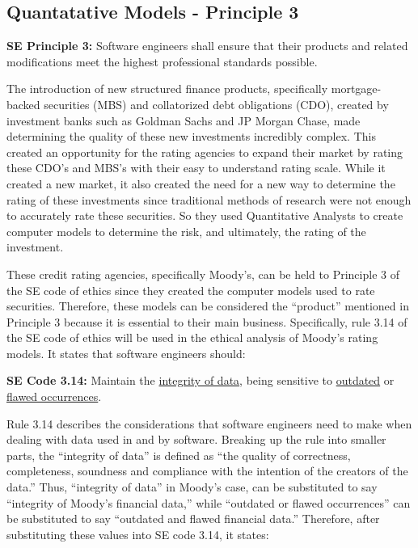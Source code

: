 \documentclass[11pt]{article}
\begin{document}
\begin{multicols}{2}
 
\subsection{Quantatative Models - Principle 3}

\begin{framed}
\noindent
\textbf{SE Principle 3:  }
\newline
Software engineers shall ensure that their products and related modifications meet the highest professional standards possible.
\end{framed}

The introduction of new structured finance products, specifically mortgage-backed securities (MBS) and collatorized debt obligations (CDO), created by investment banks such as Goldman Sachs and JP Morgan Chase, made determining the quality of these new investments incredibly complex. \cite[p.43]{govtReport} This created an opportunity for the rating agencies to expand their market by rating these CDO's and MBS's with their easy to understand rating scale. \cite[p.43]{govtReport}  While it created a new market, it also created the need for a new way to determine the rating of these investments since traditional methods of research were not enough to accurately rate these securities.\cite[p.43]{govtReport}  So they used Quantitative Analysts to create computer models to determine the risk, and ultimately, the rating of the investment. \cite{wiredFormula}\cite[p.120]{govtReport}  

These credit rating agencies, specifically Moody's, can be held to Principle 3 of the SE code of ethics since they created the computer models used to rate securities.  Therefore, these models can be considered the ``product''\cite{SEcode} mentioned in Principle 3 because it is essential to their main business.  Specifically, rule 3.14 of the SE code of ethics will be used in the ethical analysis of Moody's rating models.  It states that software engineers should:

\begin{framed}
\noindent
   \textbf{SE Code 3.14: } 
   \newline
   Maintain the \underline{integrity of data}, being sensitive to \underline{outdated} or \underline{flawed occurrences}.
\end{framed}

Rule 3.14 describes the considerations that software engineers need to make when dealing with data used in and by software.  Breaking up the rule into smaller parts, the ``integrity of data'' \cite{SEcode} is defined as ``the quality of correctness, completeness, soundness and compliance with the intention of the creators of the data.'' \cite{dataIntegrityDef} Thus, ``integrity of data'' in Moody's case, can be substituted to say ``integrity of Moody's financial data,'' while ``outdated or flawed occurrences'' \cite{SEcode} can be substituted to say ``outdated and flawed financial data.''  Therefore, after substituting these values into SE code 3.14, it states:


\end{multicols}
\end{document}
